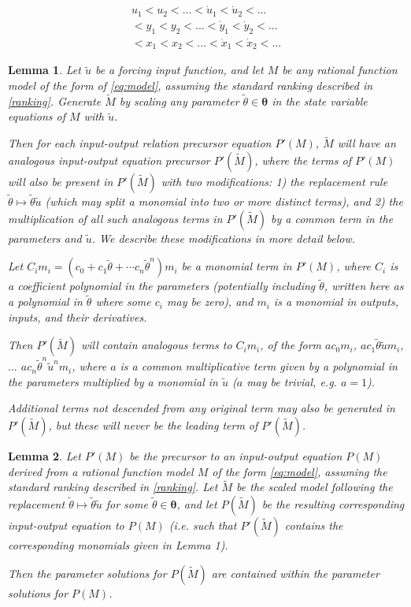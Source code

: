 \documentclass[10pt,a4paper]{amsart}
\newtheorem{lemma}{Lemma}
\begin{document}
\begin{multline} \label{ranking}
u_1 < u_2 < ... <\dot{u}_1 < \dot{u}_2 < ... \\< y_1 < y_2 < ... <\dot{y}_1 < \dot{y}_2 < ...\\< x_1 < x_2 < ...<\dot{x}_1 < \dot{x}_2 < ...
\end{multline}

\begin{lemma} \label{newform} 
Let $\tilde{u}$ be a forcing input function, and let $M$ be any rational function model of the form of \cref{eq:model}, assuming the standard ranking described in \cref{ranking}. Generate $\tilde{M}$ by scaling any parameter $\tilde{\theta} \in \pmb{\theta}$ in the state variable equations of $M$ with $\tilde{u}$.
     
Then for each input-output relation precursor equation $P'(M)$, $\tilde{M}$ will have an analogous input-output equation precursor $P'(\tilde{M})$, where the terms of $P'(M)$ will also be present in $P'(\tilde{M})$ with two modifications: 1) the replacement rule $\tilde{\theta} \mapsto \tilde{\theta}\tilde{u}$ (which may split a monomial into two or more distinct terms), and 2) the multiplication of all such analogous terms in $P'(\tilde{M})$ by a common term in the parameters and $\tilde{u}$. We describe these modifications in more detail below.

Let $C_im_i = (c_0 + c_1\tilde{\theta} + \cdots c_n\tilde{\theta}^n)m_i$ be a monomial term in $P'(M)$, where $C_i$ is a coefficient polynomial in the parameters (potentially including $\tilde{\theta}$, written here as a polynomial in $\tilde{\theta}$ where some $c_i$ may be zero), and  $m_i$ is a monomial in outputs, inputs, and their derivatives. 

Then $P'(\tilde{M})$ will contain analogous terms to $C_im_i$, of the form $ac_0m_i$, $ac_1\tilde{\theta}\tilde{u}m_i$, $\dots$ $ac_n\tilde{\theta}^n\tilde{u}^nm_i$, where $a$ is a common multiplicative term given by a polynomial in the parameters multiplied by a monomial in $\tilde{u}$ ($a$ may be trivial, e.g. $a=1$).

Additional terms not descended from any original term may also be generated in $P'(\tilde{M})$, but these will never be the leading term of $P'(\tilde{M})$.

\end{lemma}

\begin{lemma} \label{infsafe}
    Let $P'(M)$ be the precursor to an input-output equation $P(M)$ derived from a rational function model $M$ of the form \cref{eq:model}, assuming the standard ranking described in \cref{ranking}. 
    Let $\tilde{M}$ be the scaled model following the replacement $\tilde{\theta}\mapsto \tilde{\theta}\tilde{u}$ for some $\tilde{\theta} \in \pmb{\theta}$, and let $P(\tilde{M})$ be the resulting corresponding input-output equation to $P(M)$ (i.e. such that $P'(\tilde{M})$ contains the corresponding monomials given in Lemma 1).
    
    Then the parameter solutions for $P(\tilde{M})$ are contained within the parameter solutions for $P(M)$. 
\end{lemma}
\end{document}
